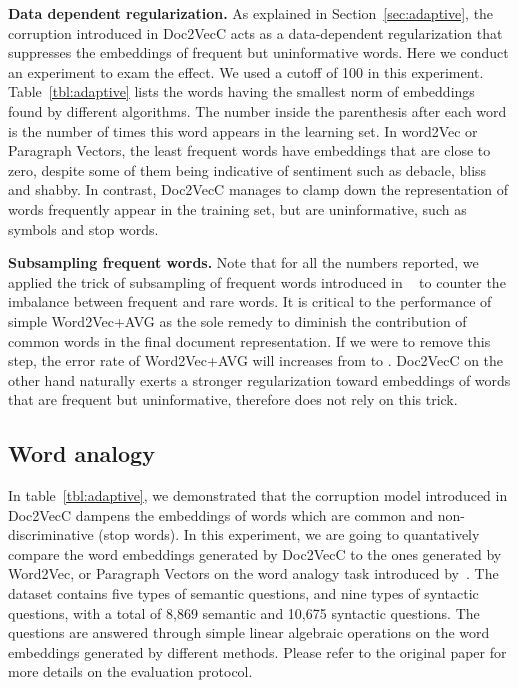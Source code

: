 \documentclass{article} \usepackage{iclr2017_conference,times}
\newcommand{\name}{Doc2VecC}
\begin{document}
\textbf{Data dependent regularization.} As explained in Section~\ref{sec:adaptive}, the corruption introduced in \name{} acts as a data-dependent regularization that suppresses the embeddings of frequent but uninformative words. Here we conduct an experiment to exam the effect. We used a cutoff  of 100 in this experiment. Table~\ref{tbl:adaptive} lists the words having the smallest  norm of embeddings found by different algorithms. The number inside the parenthesis after each word is the number of times this word appears in the learning set. In word2Vec or Paragraph Vectors, the least frequent words have embeddings that are close to zero, despite some of them being indicative of sentiment such as debacle, bliss and shabby. In contrast, \name{} manages to clamp down the representation of words frequently appear in the training set, but are uninformative, such as symbols and stop words. 


\textbf{Subsampling frequent words.} Note that for all the numbers reported, we applied the trick of subsampling of frequent words introduced in ~\citep{mikolov2013distributed} to counter the imbalance between frequent and rare words. It is critical to the performance of simple Word2Vec+AVG as the sole remedy to diminish the contribution of common words in the final document representation. If we were to remove this step, the error rate of Word2Vec+AVG will increases from   to . \name{} on the other hand naturally exerts a stronger regularization toward embeddings of words that are frequent but uninformative, therefore does not rely on this trick. 


\subsection{Word analogy}
In table~\ref{tbl:adaptive}, we demonstrated that the corruption model introduced in \name{}  dampens the embeddings of words which are common and non-discriminative (stop words). In this experiment, we are going to quantatively compare the word embeddings generated by \name{} to the ones generated by Word2Vec, or  Paragraph Vectors on the word analogy task introduced by~\cite{mikolov2013efficient}.  The dataset contains five types of semantic questions, and nine types of syntactic questions, with a total of 8,869 semantic and 10,675 syntactic questions. The questions are answered through simple linear algebraic operations on the word embeddings generated by different methods. Please refer to the original paper for more details on the evaluation protocol. 
\end{document}
